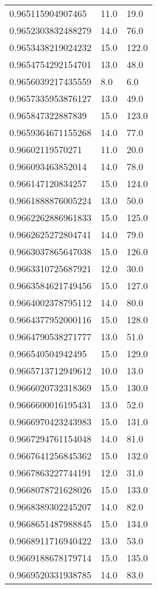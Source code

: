 \begin{center}
\begin{supertabular}[H]{p{0.30\textwidth}p{0.05\textwidth}p{0.05\textwidth}}
0.965115904907465 & 11.0 & 19.0 \\ 
0.9652303832488279 & 14.0 & 76.0 \\ 
0.9653438219024232 & 15.0 & 122.0 \\ 
0.9654754292154701 & 13.0 & 48.0 \\ 
0.9656039217435559 & 8.0 & 6.0 \\ 
0.9657335953876127 & 13.0 & 49.0 \\ 
0.965847322887839 & 15.0 & 123.0 \\ 
0.9659364671155268 & 14.0 & 77.0 \\ 
0.96602119570271 & 11.0 & 20.0 \\ 
0.966093463852014 & 14.0 & 78.0 \\ 
0.966147120834257 & 15.0 & 124.0 \\ 
0.9661888876005224 & 13.0 & 50.0 \\ 
0.9662262886961833 & 15.0 & 125.0 \\ 
0.9662625272804741 & 14.0 & 79.0 \\ 
0.9663037865647038 & 15.0 & 126.0 \\ 
0.9663310725687921 & 12.0 & 30.0 \\ 
0.9663584621749456 & 15.0 & 127.0 \\ 
0.9664002378795112 & 14.0 & 80.0 \\ 
0.9664377952000116 & 15.0 & 128.0 \\ 
0.9664790538271777 & 13.0 & 51.0 \\ 
0.966540504942495 & 15.0 & 129.0 \\ 
0.9665713712949612 & 10.0 & 13.0 \\ 
0.9666020732318369 & 15.0 & 130.0 \\ 
0.9666600016195431 & 13.0 & 52.0 \\ 
0.9666970423243983 & 15.0 & 131.0 \\ 
0.9667294761154048 & 14.0 & 81.0 \\ 
0.9667641256845362 & 15.0 & 132.0 \\ 
0.9667863227744191 & 12.0 & 31.0 \\ 
0.9668078721628026 & 15.0 & 133.0 \\ 
0.9668389302245207 & 14.0 & 82.0 \\ 
0.9668651487988845 & 15.0 & 134.0 \\ 
0.9668911716940422 & 13.0 & 53.0 \\ 
0.9669188678179714 & 15.0 & 135.0 \\ 
0.9669520331938785 & 14.0 & 83.0 \\ 

\end{supertabular}
\end{center}
